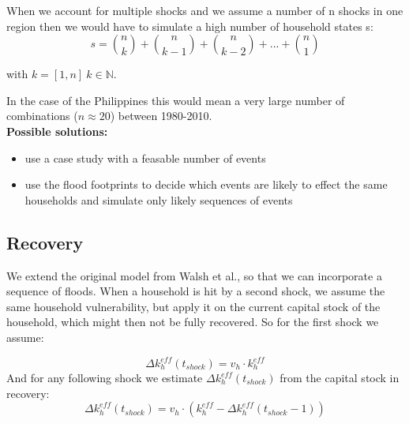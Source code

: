 \documentclass{article}
\begin{document}
When we account for multiple shocks and we assume a number of n shocks in one region then we would have to simulate a high number of household states s:
\begin{equation}
s = \binom{n}{k} + \binom{n}{k-1} + \binom{n}{k-2}+ ... + \binom{n}{1}
\end{equation}

with $k = [1,n]  \ k \in \mathbb{N}$.

In the case of the Philippines this would mean  a very large number of combinations ($n \approx 20$) between 1980-2010.\\


\textbf{Possible solutions:}
\begin{itemize}
	\item use a case study with a feasable number of events 
	\item use the flood footprints to decide which events are likely to effect the same households and simulate only likely sequences of events
	
\end{itemize}


\subsection{Recovery}
We extend the original model from Walsh et al., so that we can incorporate a sequence of floods. When a household is hit by a second shock, we assume the same household vulnerability, but apply it on the current capital stock of the household, which might then not be fully recovered.
So for the first shock we assume:

\begin{equation}
\Delta k_h^{eff}(t_{shock}) = v_h \cdot k_h^{eff} 
\end{equation}
And for any following shock we estimate $\Delta k_h^{eff}(t_{shock})$ from the capital stock in recovery:
\begin{equation}
\Delta k_h^{eff}(t_{shock}) = v_h \cdot (k_h^{eff} -  \Delta k_h^{eff}(t_{shock} - 1))
\end{equation}
\end{document}
